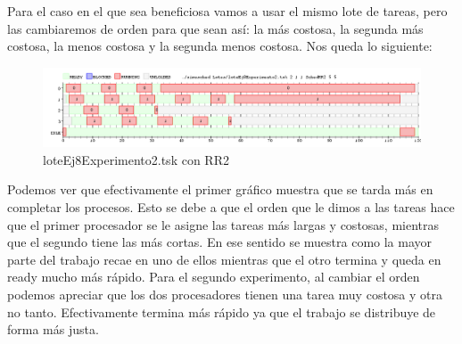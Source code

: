 Para el caso en el que sea beneficiosa vamos a usar el mismo lote de tareas, pero las cambiaremos de orden para que sean así: 
la más costosa, la segunda más costosa, la menos costosa y la segunda menos costosa. Nos queda lo siguiente:

\begin{figure}[H]
  \centering
    \includegraphics[width=1.1\textwidth]{imagenes/Ej8Experimento2.png}
  \caption{loteEj8Experimento2.tsk con RR2}
\end{figure}

Podemos ver que efectivamente el primer gráfico muestra que se tarda más en completar los procesos. Esto se debe a que el orden que le dimos a las tareas hace que el primer
procesador se le asigne las tareas más largas y costosas, mientras que el segundo tiene las más cortas. En ese sentido se muestra como la mayor parte del trabajo recae en uno de ellos
mientras que el otro termina y queda en ready mucho más rápido. Para el segundo experimento, al cambiar el orden podemos apreciar que los dos procesadores tienen una tarea
muy costosa y otra no tanto. Efectivamente termina más rápido ya que el trabajo se distribuye de forma más justa.